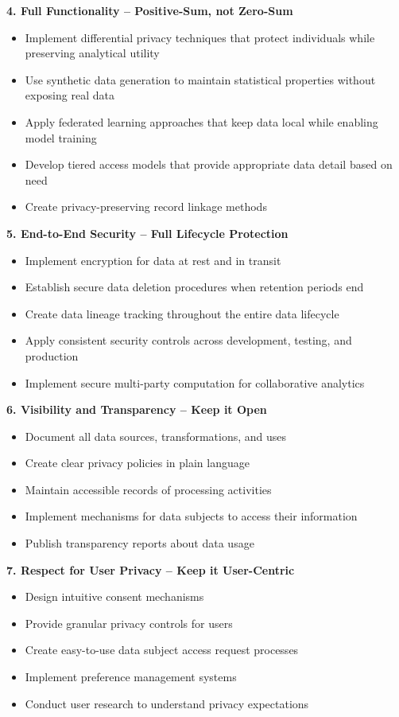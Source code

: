 \documentclass[12pt]{article}
\begin{document}
\begin{enumerate}
\begin{tcolorbox}[colback=blue!5!white,colframe=blue!75!black,title={Solution}]
    \textbf{4. Full Functionality – Positive-Sum, not Zero-Sum}
    \begin{itemize}
        \item Implement differential privacy techniques that protect individuals while preserving analytical utility
        \item Use synthetic data generation to maintain statistical properties without exposing real data
        \item Apply federated learning approaches that keep data local while enabling model training
        \item Develop tiered access models that provide appropriate data detail based on need
        \item Create privacy-preserving record linkage methods
    \end{itemize}
    
    \textbf{5. End-to-End Security – Full Lifecycle Protection}
    \begin{itemize}
        \item Implement encryption for data at rest and in transit
        \item Establish secure data deletion procedures when retention periods end
        \item Create data lineage tracking throughout the entire data lifecycle
        \item Apply consistent security controls across development, testing, and production
        \item Implement secure multi-party computation for collaborative analytics
    \end{itemize}
    
    \textbf{6. Visibility and Transparency – Keep it Open}
    \begin{itemize}
        \item Document all data sources, transformations, and uses
        \item Create clear privacy policies in plain language
        \item Maintain accessible records of processing activities
        \item Implement mechanisms for data subjects to access their information
        \item Publish transparency reports about data usage
    \end{itemize}
    
    \textbf{7. Respect for User Privacy – Keep it User-Centric}
    \begin{itemize}
        \item Design intuitive consent mechanisms
        \item Provide granular privacy controls for users
        \item Create easy-to-use data subject access request processes
        \item Implement preference management systems
        \item Conduct user research to understand privacy expectations
    \end{itemize}
    

\end{tcolorbox}
\end{enumerate}
\end{document}
